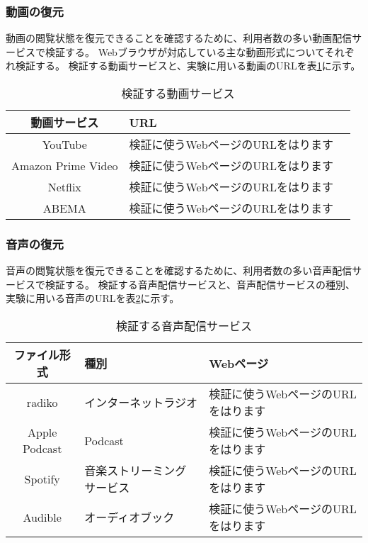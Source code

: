 \subsubsection{動画の復元}
動画の閲覧状態を復元できることを確認するために、利用者数の多い動画配信サービスで検証する。
Webブラウザが対応している主な動画形式についてそれぞれ検証する。
検証する動画サービスと、実験に用いる動画のURLを表\ref{tb:evl-video-check-list}に示す。

\begin{table}[htbp]
  \begin{center}
    \caption{検証する動画サービス}
    \label{tb:evl-video-check-list}
    \begin{tabular}{|c|l|l|}
      \hline
      動画サービス & URL \\\hline\hline
      YouTube & 検証に使うWebページのURLをはります \\\hline
      Amazon Prime Video & 検証に使うWebページのURLをはります \\\hline
      Netflix & 検証に使うWebページのURLをはります \\\hline
      ABEMA & 検証に使うWebページのURLをはります \\\hline
    \end{tabular}
  \end{center}
\end{table}

\subsubsection{音声の復元}
音声の閲覧状態を復元できることを確認するために、利用者数の多い音声配信サービスで検証する。
検証する音声配信サービスと、音声配信サービスの種別、実験に用いる音声のURLを表\ref{tb:evl-audio-check-list}に示す。

\begin{table}[htbp]
  \begin{center}
    \caption{検証する音声配信サービス}
    \label{tb:evl-audio-check-list}
    \begin{tabular}{|c|l|l|}
      \hline
      ファイル形式 & 種別 & Webページ \\\hline\hline
      radiko & インターネットラジオ & 検証に使うWebページのURLをはります \\\hline
      Apple Podcast & Podcast & 検証に使うWebページのURLをはります \\\hline
      Spotify & 音楽ストリーミングサービス & 検証に使うWebページのURLをはります \\\hline
      Audible & オーディオブック & 検証に使うWebページのURLをはります \\\hline
    \end{tabular}
  \end{center}
\end{table}

